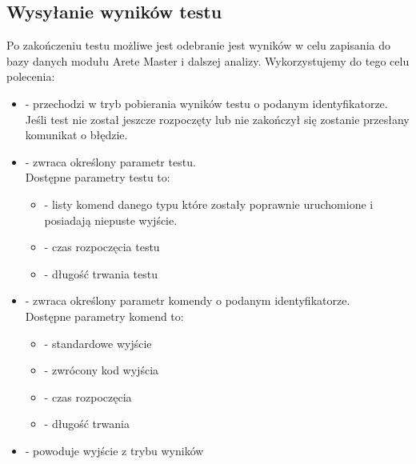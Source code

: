 \documentclass[00-praca-magisterska.tex]{subfiles}
\begin{document}
\subsection{Wysyłanie wyników testu}

Po zakończeniu testu możliwe jest odebranie jest wyników w celu zapisania do
bazy danych modułu Arete Master i dalszej analizy. Wykorzystujemy do tego celu
polecenia:

\begin{itemize}
  \setlength{\itemsep}{10pt}

\item{ - przechodzi w tryb pobierania
wyników testu o podanym identyfikatorze. Jeśli test nie został jeszcze
rozpoczęty lub nie zakończył się zostanie przesłany komunikat o błędzie.}

\item{ - zwraca określony parametr testu. \\

Dostępne parametry testu to: \\

\begin{itemize}
  \setlength{\itemsep}{10pt}

\item{ - listy komend danego typu które
zostały poprawnie uruchomione i posiadają niepuste wyjście.}

\item{ - czas rozpoczęcia testu}

\item{ - długość trwania testu}

\end{itemize}}

\item{ - zwraca określony parametr
komendy o podanym identyfikatorze. \\

Dostępne parametry komend to: \\

\begin{itemize}
  \setlength{\itemsep}{10pt}

\item{ - standardowe wyjście}

\item{ - zwrócony kod wyjścia}

\item{ - czas rozpoczęcia}

\item{ - długość trwania}

\end{itemize}}

\item{ - powoduje wyjście z trybu wyników}

\end{itemize}
\end{document}
